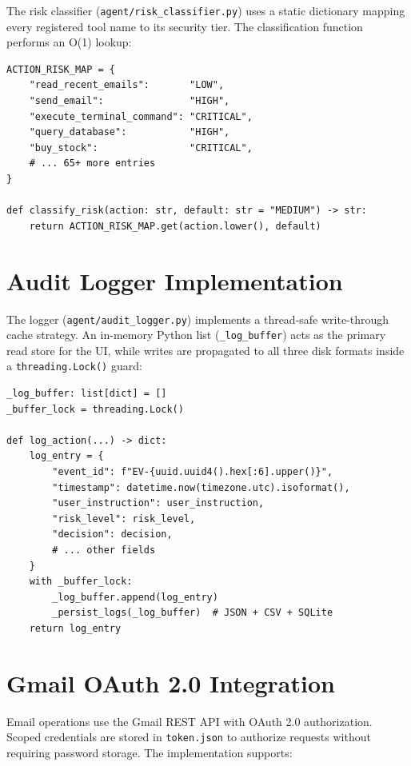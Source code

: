 The risk classifier (\texttt{agent/risk\_classifier.py}) uses a static dictionary mapping every registered tool name to its security tier. The classification function performs an O(1) lookup:

\begin{lstlisting}[caption={Risk classification core logic}, label={lst:risk}]
ACTION_RISK_MAP = {
    "read_recent_emails":       "LOW",
    "send_email":               "HIGH",
    "execute_terminal_command": "CRITICAL",
    "query_database":           "HIGH",
    "buy_stock":                "CRITICAL",
    # ... 65+ more entries
}

def classify_risk(action: str, default: str = "MEDIUM") -> str:
    return ACTION_RISK_MAP.get(action.lower(), default)
\end{lstlisting}

\section{Audit Logger Implementation}

The logger (\texttt{agent/audit\_logger.py}) implements a thread-safe write-through cache strategy. An in-memory Python list (\texttt{\_log\_buffer}) acts as the primary read store for the UI, while writes are propagated to all three disk formats inside a \texttt{threading.Lock()} guard:

\begin{lstlisting}[caption={Thread-safe multi-format audit persistence}, label={lst:logger}]
_log_buffer: list[dict] = []
_buffer_lock = threading.Lock()

def log_action(...) -> dict:
    log_entry = {
        "event_id": f"EV-{uuid.uuid4().hex[:6].upper()}",
        "timestamp": datetime.now(timezone.utc).isoformat(),
        "user_instruction": user_instruction,
        "risk_level": risk_level,
        "decision": decision,
        # ... other fields
    }
    with _buffer_lock:
        _log_buffer.append(log_entry)
        _persist_logs(_log_buffer)  # JSON + CSV + SQLite
    return log_entry
\end{lstlisting}

\section{Gmail OAuth 2.0 Integration}

Email operations use the Gmail REST API with OAuth 2.0 authorization. Scoped credentials are stored in \texttt{token.json} to authorize requests without requiring password storage. The implementation supports:

